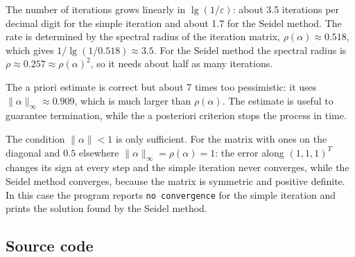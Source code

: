 The number of iterations grows linearly in $\lg(1/\varepsilon)$: about 3.5 iterations per decimal
digit for the simple iteration and about 1.7 for the Seidel method. The rate is determined by the
spectral radius of the iteration matrix, $\rho(\alpha) \approx 0.518$, which gives
$1 / \lg(1/0.518) \approx 3.5$. For the Seidel method the spectral radius is
$\rho \approx 0.257 \approx \rho(\alpha)^2$, so it needs about half as many iterations.

The a priori estimate is correct but about 7 times too pessimistic: it uses
$\|\alpha\|_\infty \approx 0.909$, which is much larger than $\rho(\alpha)$. The estimate is
useful to guarantee termination, while the a posteriori criterion stops the process in time.

The condition $\|\alpha\| < 1$ is only sufficient. For the matrix with ones on the diagonal and
$0.5$ elsewhere $\|\alpha\|_\infty = \rho(\alpha) = 1$: the error along $(1, 1, 1)^T$ changes its
sign at every step and the simple iteration never converges, while the Seidel method converges,
because the matrix is symmetric and positive definite. In this case the program reports
\texttt{no convergence} for the simple iteration and prints the solution found by the Seidel
method.

\subsection{Source code}




\pagebreak
